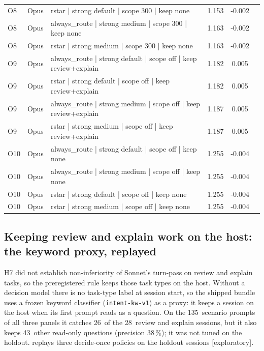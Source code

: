 \documentclass[11pt,letterpaper]{article}
\newcommand{\expl}{\mbox{\textsf{\small\color{okgray}[exploratory]}}}
\newcommand{\code}[1]{\texttt{#1}}
\newcommand{\KpCaught}{26}
\newcommand{\KpClassifier}{intent-kw-v1}
\newcommand{\KpOthers}{43}
\newcommand{\KpPrecision}{38}
\newcommand{\KpPrompts}{135}
\newcommand{\KpRexN}{28}
\begin{document}
\begin{xltabular}{\textwidth}{l l >{\raggedright\arraybackslash}X S[table-format=1.3] S[table-format=-1.3] c}
O8 & Opus & rstar | strong default | scope 300 | keep none & 1.153 & -0.002 &  \\
O8 & Opus & always\_route | strong medium | scope 300 | keep none & 1.163 & -0.002 &  \\
O8 & Opus & rstar | strong medium | scope 300 | keep none & 1.163 & -0.002 &  \\
O9 & Opus & always\_route | strong default | scope off | keep review+explain & 1.182 & 0.005 &  \\
O9 & Opus & rstar | strong default | scope off | keep review+explain & 1.182 & 0.005 &  \\
O9 & Opus & always\_route | strong medium | scope off | keep review+explain & 1.187 & 0.005 &  \\
O9 & Opus & rstar | strong medium | scope off | keep review+explain & 1.187 & 0.005 &  \\
O10 & Opus & always\_route | strong default | scope off | keep none & 1.255 & -0.004 &  \\
O10 & Opus & always\_route | strong medium | scope off | keep none & 1.255 & -0.004 &  \\
O10 & Opus & rstar | strong default | scope off | keep none & 1.255 & -0.004 &  \\
O10 & Opus & rstar | strong medium | scope off | keep none & 1.255 & -0.004 &  \\
\bottomrule
\end{xltabular}
 \FloatBarrier
\endgroup

\subsection{Keeping review and explain work on the host: the keyword proxy, replayed}\label{sec:proxy}

H7 did not establish non-inferiority of Sonnet's turn-pass on review and explain tasks, so the preregistered rule keeps
those task types on the host. Without a decision model there is no task-type label at session start, so the shipped
bundle uses a frozen keyword classifier (\code{\KpClassifier}) as a proxy: it keeps a session on the host when its first
prompt reads as a question. On the \KpPrompts\ scenario prompts of all three panels it catches \KpCaught\ of the
\KpRexN\ review and explain sessions, but it also keeps \KpOthers\ other read-only questions (precision
\KpPrecision\,\%); it was not tuned on the holdout.  replays three decide-once policies on the holdout
sessions \expl.
\end{document}
